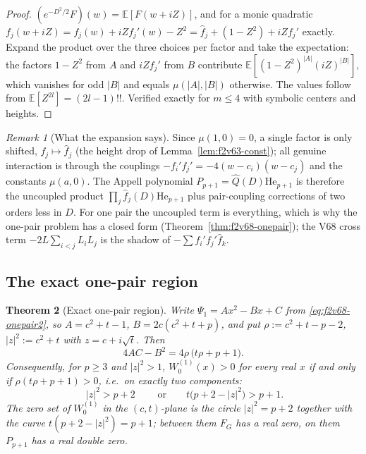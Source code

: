 \documentclass[11pt]{article}
\newtheorem{theorem}{Theorem}[section]
\theoremstyle{definition}
\theoremstyle{remark}
\newtheorem{remark}[theorem]{Remark}
\begin{document}
\begin{proof}
\((e^{-D^2/2}F)(w)=\mathbb E[F(w+iZ)]\), and for a monic quadratic
\(f_j(w+iZ)=f_j(w)+iZf_j'(w)-Z^2=\widehat f_j+(1-Z^2)+iZf_j'\) exactly.
Expand the product over the three choices per factor and take the
expectation: the factors \(1-Z^2\) from \(A\) and \(iZf_j'\) from \(B\)
contribute \(\mathbb E[(1-Z^2)^{|A|}(iZ)^{|B|}]\), which vanishes for odd
\(|B|\) and equals \(\mu(|A|,|B|)\) otherwise.  The values follow from
\(\mathbb E[Z^{2l}]=(2l-1)!!\).  Verified exactly for \(m\le4\) with
symbolic centers and heights.
\end{proof}

\begin{remark}[What the expansion says]
\label{rem:f2v69-pairing}
Since \(\mu(1,0)=0\), a single factor is only shifted, \(f_j\mapsto\widehat f_j\)
(the height drop of Lemma~\ref{lem:f2v63-const}); all genuine interaction
is through the couplings \(-f_i'f_j'=-4(w-c_i)(w-c_j)\) and the constants
\(\mu(a,0)\).  The Appell polynomial \(P_{p+1}=\widehat Q(D)\mathrm{He}_{p+1}\)
is therefore the uncoupled product \(\prod_j\widehat f_j(D)\mathrm{He}_{p+1}\)
plus pair-coupling corrections of two orders less in \(D\).  For one pair
the uncoupled term is everything, which is why the one-pair problem has a
closed form (Theorem~\ref{thm:f2v68-onepair}); the V68 cross term
\(-2L\sum_{i<j}L_iL_j\) is the shadow of \(-\sum f_i'f_j'\widehat f_k\).
\end{remark}

\subsection{The exact one-pair region}

\begin{theorem}[Exact one-pair region]
\label{thm:f2v69-circle}
Write \(\Psi_1=Ax^2-Bx+C\) from \eqref{eq:f2v68-onepair2}, so
\(A=c^2+t-1\), \(B=2c(c^2+t+p)\), and put \(\rho:=c^2+t-p-2\),
\(|z|^2:=c^2+t\) with \(z=c+i\sqrt t\).  Then
\begin{equation}
 4AC-B^2=4\rho\,\bigl(t\rho+p+1\bigr).
 \label{eq:f2v69-disc}
\end{equation}
Consequently, for \(p\ge3\) and \(|z|^2>1\), \(W_0^{(1)}(x)>0\) for every
real \(x\) if and only if \(\rho(t\rho+p+1)>0\), i.e.\ on exactly two
components:
\begin{equation}
 \boxed{\;|z|^2>p+2\;}\qquad\text{or}\qquad t\bigl(p+2-|z|^2\bigr)>p+1 .
 \label{eq:f2v69-circle}
\end{equation}
The zero set of \(W_0^{(1)}\) in the \((c,t)\)-plane is the circle
\(|z|^2=p+2\) together with the curve \(t(p+2-|z|^2)=p+1\); between them
\(F_G\) has a real zero, on them \(P_{p+1}\) has a real double zero.
\end{theorem}
\end{document}
